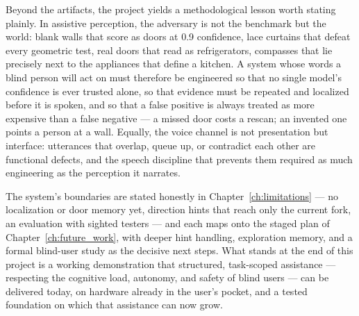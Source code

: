 Beyond the artifacts, the project yields a methodological lesson worth stating
plainly. In assistive perception, the adversary is not the benchmark but the
world: blank walls that score as doors at 0.9 confidence, lace curtains that
defeat every geometric test, real doors that read as refrigerators, compasses that
lie precisely next to the appliances that define a kitchen. A system whose words a
blind person will act on must therefore be engineered so that no single model's
confidence is ever trusted alone, so that evidence must be repeated and localized
before it is spoken, and so that a false positive is always treated as more
expensive than a false negative --- a missed door costs a rescan; an invented one
points a person at a wall. Equally, the voice channel is not presentation but
interface: utterances that overlap, queue up, or contradict each other are
functional defects, and the speech discipline that prevents them required as much
engineering as the perception it narrates.

The system's boundaries are stated honestly in Chapter~\ref{ch:limitations} ---
no localization or door memory yet, direction hints that reach only the current
fork, an evaluation with sighted testers --- and each maps onto the
staged plan of Chapter~\ref{ch:future_work}, with deeper hint handling,
exploration memory, and a formal blind-user study as the decisive
next steps. What stands at the end of this project is a working demonstration
that structured, task-scoped assistance --- respecting the cognitive load,
autonomy, and safety of blind users --- can be delivered today, on hardware
already in the user's pocket, and a tested foundation on which that assistance
can now grow.